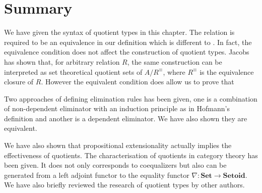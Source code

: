 \section{Summary}

We have given the syntax of quotient types in this chapter. The relation is required to be an equivalence in our definition which is different to \cite{hof:95:sm}. In fact, the equivalence condition does not affect the construction of quotient types. Jacobs  \cite{Jacobs94quotientsin}  has shown that, for arbitrary relation $R$, the same construction can be interpreted as set theoretical quotient sets of $A/R^{\equiv}$, where $R^{\equiv}$ is the equivalence closure of $R$. However the equivalent condition does allow us to prove that 

 Two approaches of defining elimination rules has been given, one is a combination of non-dependent eliminator with an induction principle as in Hofmann's definition and another is a dependent eliminator. We have also shown they are equivalent. 

We have also shown that propositional extensionality actually implies the effectiveness of quotients. The characterisation of quotients in category theory has been given. It does not only corresponds to coequalizers but also can be generated from a left adjoint functor to the equality functor $\nabla : \textbf{Set} \to \textbf{Setoid}$. We have also briefly reviewed the research of quotient types by other authors.






